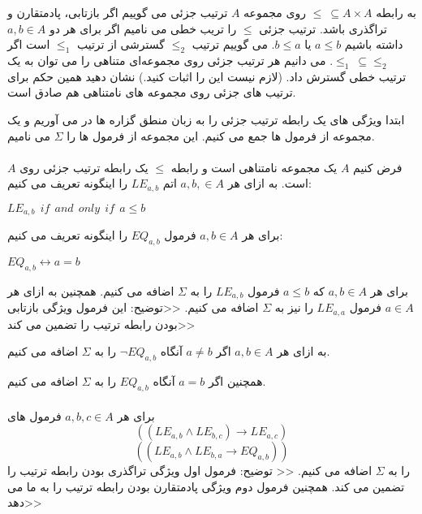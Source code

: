 
به رابطه 
$\leq \ \subseteq A \times A$
روی مجموعه
$A$
ترتیب جزئی می گوییم اگر بازتابی، پادمتقارن و تراگذری باشد. ترتیب جزئی
$\leq$
را تریب خطی می نامیم اگر برای هر دو
$a,b\in A$
داشته باشیم 
$a\leq b$
یا
$b\leq a$.
می گوییم ترتیب 
$\leq_2$
گسترشی از ترتیب 
$\leq_1$
است اگر 
$\leq_1\ \subseteq \leq_2$.
می دانیم هر ترتیب جزئی روی مجموعه‌ای متناهی را می توان به یک ترتیب خطی گسترش داد. 
(لازم نیست این را اثبات کنید.)
نشان دهید همین حکم برای ترتیب های جزئی روی مجموعه های نامتناهی هم صادق است.

\begin{ans}
    ابتدا ویژگی های یک رابطه ترتیب جزئی را به زبان منطق گزاره ها در می آوریم و یک مجموعه از فرمول ها جمع می کنیم. این مجموعه از فرمول ها را 
    $\Sigma$
    می نامیم.
    \\
    \\
    فرض کنیم 
    $A$
    یک مجموعه نامتناهی است و رابطه 
    $\leq$
    یک رابطه ترتیب جزئی روی 
    $A$
    است. به ازای هر 
    $a,b, \in A$
    اتم 
    $LE_{a,b}$
    را اینگونه تعریف می کنیم:
    \begin{flushleft}
        $LE_{a,b} \ \ if \ \ and \ \ only \ \ if \ \ a \leq b$
    \end{flushleft}
    برای هر 
    $a,b \in A$
    فرمول
    $EQ_{a,b}$
    را اینگونه تعریف می کنیم:
    \begin{flushleft}
        $EQ_{a,b} \leftrightarrow a = b$
    \end{flushleft}

    برای هر 
    $a,b \in A$
    که 
    $a \leq b$
    فرمول 
    $LE_{a,b}$
    را به 
    $\Sigma$
    اضافه می کنیم. همچنین به ازای هر 
    $a\in A$
    فرمول 
    $LE_{a,a}$
    را نیز به 
    $\Sigma$
    اضافه می کنیم. 
    <<توضیح: این فرمول ویژگی بازتابی بودن رابطه ترتیب را تضمین می کند>>

    به ازای هر 
    $a,b \in A$
    اگر 
    $a \neq b$
    آنگاه 
    $\neg EQ_{a,b}$
    را به 
    $\Sigma$
    اضافه می کنیم.

    همچنین اگر 
    $a = b$
    آنگاه 
    $EQ_{a,b}$
    را به 
    $\Sigma$
    اضافه می کنیم. 
    \\
    \\
    برای هر 
    $a,b,c \in A$
    فرمول های
    \[((LE_{a,b}\land LE_{b,c})\rightarrow LE_{a,c})\]
    \[((LE_{a,b}\land LE_{b,a}\rightarrow EQ_{a,b}))\]
    را به 
    $\Sigma$
    اضافه می کنیم.
    << توضیح: فرمول اول ویژگی تراگذری بودن رابطه ترتیب را تضمین می کند. همچنین فرمول دوم ویژگی پادمتقارن بودن رابطه ترتیب را به ما می دهد>>


\end{ans}
